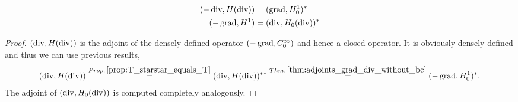 \documentclass[../main.tex]{subfiles}
\begin{document}
\begin{corollary}
    \begin{align}
        (-\operatorname{div}, H(\operatorname{div})) &= (\operatorname{grad}, H^1_0)^* \\
        (-\operatorname{grad}, H^1) &= (\operatorname{div}, H_0(\operatorname{div}))^*
    \end{align}
\end{corollary}
\begin{proof}
    $(\operatorname{div}, H(\operatorname{div}))$ is the adjoint of the densely defined operator 
    $(-\operatorname{grad}, C_0^\infty)$ and hence a closed operator. It is 
    obviously densely defined and thus we can use previous results,
    \begin{align*}
        (\operatorname{div}, H(\operatorname{div})) 
        \stackrel{Prop.\,\ref{prop:T_starstar_equals_T}}{=}(\operatorname{div}, H(\operatorname{div}))^{**} 
        \stackrel{Thm.\,\ref{thm:adjoints_grad_div_without_bc}}{=}(-\operatorname{grad}, H^1_0)^*.
    \end{align*}
    The adjoint of $(\operatorname{div}, H_0(\operatorname{div}))$ is computed completely analogously.
\end{proof}



\end{document}
